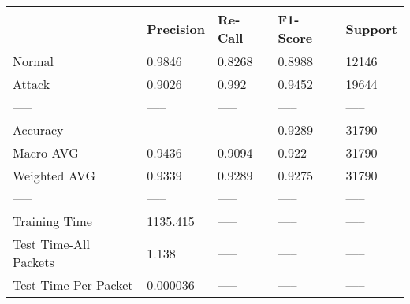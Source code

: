 \begin{tabular}{lllll}
\toprule
{} & Precision & Re-Call & F1-Score & Support \\
\midrule
Normal                &    0.9846 &  0.8268 &   0.8988 &   12146 \\
Attack                &    0.9026 &   0.992 &   0.9452 &   19644 \\
-----                 &     ----- &   ----- &    ----- &   ----- \\
Accuracy              &           &         &   0.9289 &   31790 \\
Macro AVG             &    0.9436 &  0.9094 &    0.922 &   31790 \\
Weighted AVG          &    0.9339 &  0.9289 &   0.9275 &   31790 \\
-----                 &     ----- &   ----- &    ----- &   ----- \\
Training Time         &  1135.415 &   ----- &    ----- &   ----- \\
Test Time-All Packets &     1.138 &   ----- &    ----- &   ----- \\
Test Time-Per Packet  &  0.000036 &   ----- &    ----- &   ----- \\
\bottomrule
\end{tabular}
